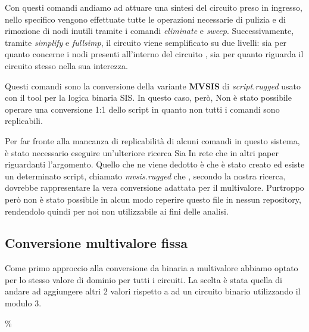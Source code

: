 \documentclass[
]{book}
\begin{document}
Con questi comandi andiamo ad attuare una sintesi del circuito preso in ingresso, nello specifico vengono effettuate tutte le operazioni necessarie di pulizia e di rimozione di nodi inutili tramite i comandi \emph{eliminate} e \emph{sweep}. Successivamente, tramite \emph{simplify} e \emph{fullsimp}, il circuito viene semplificato su due livelli: sia per quanto concerne i nodi presenti all'interno del circuito , sia per quanto riguarda il circuito stesso nella sua interezza.

Questi comandi sono la conversione della variante \textbf{MVSIS} di \emph{script.rugged} usato con il tool per la logica binaria SIS. In questo caso, però, Non è stato possibile operare una conversione 1:1 dello script in quanto non tutti i comandi sono replicabili.

Per far fronte alla mancanza di replicabilità di alcuni comandi in questo sistema, è stato necessario eseguire un'ulteriore ricerca Sia In rete che in altri paper riguardanti l'argomento. Quello che ne viene dedotto è che è stato creato ed esiste un determinato script, chiamato \emph{mvsis.rugged} che , secondo la nostra ricerca, dovrebbe rappresentare la vera conversione adattata per il multivalore. Purtroppo però non è stato possibile in alcun modo reperire questo file in nessun repository, rendendolo quindi per noi non utilizzabile ai fini delle analisi.

\newpage

\hypertarget{conversione-multivalore-fissa}{%
\subsection{Conversione multivalore fissa}\label{conversione-multivalore-fissa}}

Come primo approccio alla conversione da binaria a multivalore abbiamo optato per lo stesso valore di dominio per tutti i circuiti. La scelta è stata quella di andare ad aggiungere altri 2 valori rispetto a ad un circuito binario utilizzando il modulo 3.

\%

\usepackage{rotating}
\end{document}
